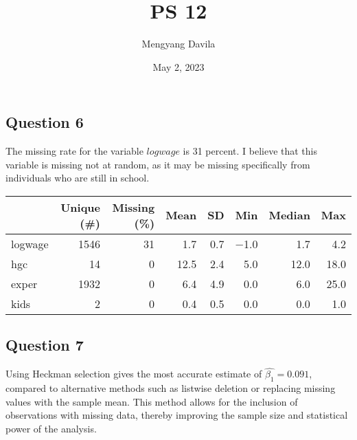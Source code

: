 \documentclass{article}
\title{PS 12}
\author{Mengyang Davila}
\date{May 2, 2023}
\begin{document}
\maketitle
\subsection*{Question 6}
The missing rate for the variable $logwage$ is 31 percent. I believe that this variable is missing not at random, as it may be missing specifically from individuals who are still in school.
\begin{table}[htbp]
\centering
\begin{tabular}[t]{lrrrrrrr}
\toprule
  & Unique (\#) & Missing (\%) & Mean & SD & Min & Median & Max\\
\midrule
logwage & 1546 & 31 & \num{1.7} & \num{0.7} & \num{-1.0} & \num{1.7} & \num{4.2}\\
hgc & 14 & 0 & \num{12.5} & \num{2.4} & \num{5.0} & \num{12.0} & \num{18.0}\\
exper & 1932 & 0 & \num{6.4} & \num{4.9} & \num{0.0} & \num{6.0} & \num{25.0}\\
kids & 2 & 0 & \num{0.4} & \num{0.5} & \num{0.0} & \num{0.0} & \num{1.0}\\
\bottomrule
\end{tabular}
\end{table}

\subsection*{Question 7}
Using Heckman selection gives the most accurate estimate of $\hat{\beta_1} = 0.091$, compared to alternative methods such as listwise deletion or replacing missing values with the sample mean. This method allows for the inclusion of observations with missing data, thereby improving the sample size and statistical power of the analysis. 
\end{document}
